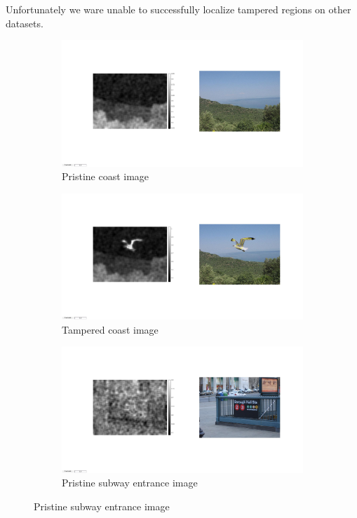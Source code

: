 \documentclass{template/acm_proc_article-sp}
\begin{document}
Unfortunately we ware unable to successfully localize tampered regions on other datasets. 
\begin{figure}
\centering

\begin{subfigure}{0.46\textwidth}
    \includegraphics[trim=275 300 200 250,clip,width=\linewidth]{report/results/f2_seagull_orig.jpg}
    \caption{Pristine coast image}
\end{subfigure}

\begin{subfigure}{0.46\textwidth}
    \includegraphics[trim=275 300 200 250,clip,width=\linewidth]{report/results/f2_seagull.jpg}
    \caption{Tampered coast image}
\end{subfigure}

\begin{subfigure}{0.46\textwidth}
    \includegraphics[trim=275 300 200 250,clip,width=\linewidth]{report/results/f2_subway_orig.jpg}
    \caption{Pristine subway entrance image}
\end{subfigure}


\end{figure}
\end{document}
